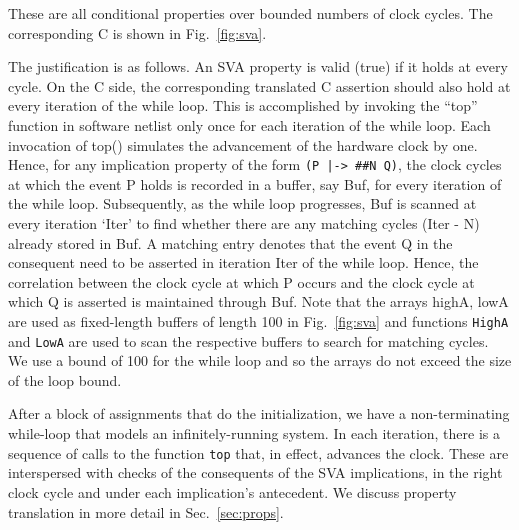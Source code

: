 \noindent These are all conditional properties over bounded numbers of clock cycles. The corresponding C is shown in Fig.~\ref{fig:sva}. 

The justification is as follows. An SVA property is valid (true) if it holds at every cycle. On the C side, the corresponding translated C assertion should also hold at every iteration of the while loop.  This is accomplished
by invoking the ``top'' function in software netlist only once for each iteration of the while loop. Each invocation of top() simulates the advancement of the hardware clock by one. Hence, for any implication property of the form \texttt{(P |-> \#\#N Q)}, the clock cycles at which the event P holds is recorded in a buffer, say Buf, for every iteration of the while loop.  Subsequently, as the while loop progresses, Buf is scanned at every iteration `Iter' to find whether there are any matching cycles (Iter - N) already stored in Buf. A matching entry denotes that the event Q in the consequent need to be asserted in iteration Iter of the while loop.  Hence, the correlation between the clock cycle at which P occurs and the clock cycle at which Q is asserted is maintained through Buf.  Note that the arrays highA, lowA are used as fixed-length buffers of length 100 in Fig.~\ref{fig:sva} and functions \texttt{HighA} and \texttt{LowA} are used to scan the respective buffers to search for matching cycles. We use a bound of 100 for the while loop and so the arrays do not exceed the size of the loop bound.

After a block of assignments that do the initialization, we have a non-terminating while-loop that models an infinitely-running system. In each iteration, there is a sequence of calls to the function \texttt{top} that, in effect, advances the clock. These are interspersed with checks of the consequents of the SVA implications, in the right clock cycle and under each implication's antecedent. We discuss property translation in more detail in Sec.~\ref{sec:props}.

